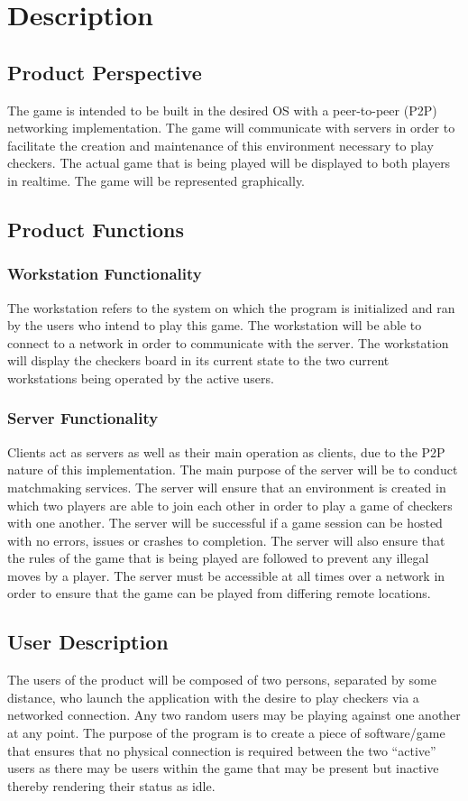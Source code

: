 \section{Description}
\subsection{Product Perspective}
The game is intended to be built in the desired OS with a peer-to-peer (P2P)
networking implementation. The game will communicate with servers in order to
facilitate the creation and maintenance of this environment necessary to play
checkers. The actual game that is being played will be displayed to both
players in realtime. The game will be represented graphically.

\subsection{Product Functions}
\subsubsection{Workstation Functionality}
The workstation refers to the system on which the program is initialized and
ran by the users who intend to play this game. The workstation will be able to
connect to a network in order to communicate with the server. The workstation
will display the checkers board in its current state to the two current
workstations being operated by the active users.

\subsubsection{Server Functionality}
Clients act as servers as well as their main operation as clients, due to the
P2P nature of this implementation. The main purpose of the server will be to
conduct matchmaking services. The server will ensure that an environment is
created in which two players are able to join each other in order to play a
game of checkers with one another. The server will be successful if a game
session can be hosted with no errors, issues or crashes to completion.  The
server will also ensure  that the rules of the game that is being played are
followed to prevent any illegal moves by a player. The server must be
accessible at all times over a network in order to ensure that the game can be
played from differing remote locations.

\subsection{User Description}
The users of the product will be composed of two persons, separated by some
distance, who launch the application with the desire to play checkers via a
networked connection.  Any two random users may be playing against one another
at any point. The purpose of the program is to create a piece of software/game
that ensures that no physical connection is required between the two “active”
users as there may be users within the game that may be present but inactive
thereby rendering their status as idle.

